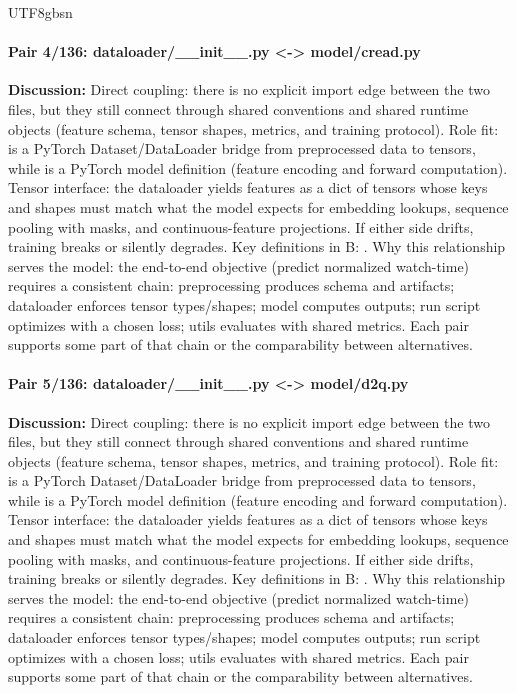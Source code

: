 \documentclass[11pt]{article}
\begin{document}
\begin{CJK*}{UTF8}{gbsn}
\paragraph{Pair 4/136: dataloader/\_\_init\_\_.py <-> model/cread.py}
\textbf{Discussion:} Direct coupling: there is no explicit import edge between the two files, but they still connect through shared conventions and shared runtime objects (feature schema, tensor shapes, metrics, and training protocol). Role fit: \texttt{} is a PyTorch Dataset/DataLoader bridge from preprocessed data to tensors, while \texttt{} is a PyTorch model definition (feature encoding and forward computation). Tensor interface: the dataloader yields features as a dict of tensors whose keys and shapes must match what the model expects for embedding lookups, sequence pooling with masks, and continuous-feature projections. If either side drifts, training breaks or silently degrades. Key definitions in B: \texttt{}. Why this relationship serves the model: the end-to-end objective (predict normalized watch-time) requires a consistent chain: preprocessing produces schema and artifacts; dataloader enforces tensor types/shapes; model computes outputs; run script optimizes with a chosen loss; utils evaluates with shared metrics. Each pair supports some part of that chain or the comparability between alternatives.

\paragraph{Pair 5/136: dataloader/\_\_init\_\_.py <-> model/d2q.py}
\textbf{Discussion:} Direct coupling: there is no explicit import edge between the two files, but they still connect through shared conventions and shared runtime objects (feature schema, tensor shapes, metrics, and training protocol). Role fit: \texttt{} is a PyTorch Dataset/DataLoader bridge from preprocessed data to tensors, while \texttt{} is a PyTorch model definition (feature encoding and forward computation). Tensor interface: the dataloader yields features as a dict of tensors whose keys and shapes must match what the model expects for embedding lookups, sequence pooling with masks, and continuous-feature projections. If either side drifts, training breaks or silently degrades. Key definitions in B: \texttt{}. Why this relationship serves the model: the end-to-end objective (predict normalized watch-time) requires a consistent chain: preprocessing produces schema and artifacts; dataloader enforces tensor types/shapes; model computes outputs; run script optimizes with a chosen loss; utils evaluates with shared metrics. Each pair supports some part of that chain or the comparability between alternatives.


\end{CJK*}
\end{document}
